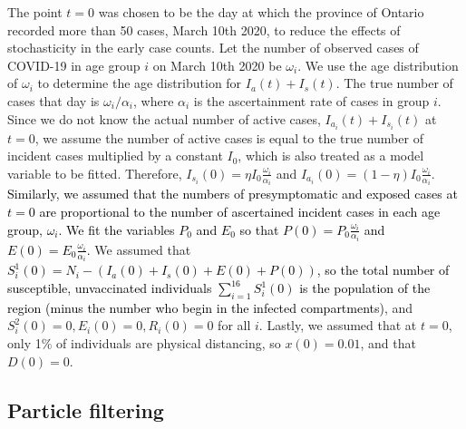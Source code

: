 The point $t = 0$ was chosen to be the day at which the province of Ontario recorded more than 50 cases, March 10th 2020, to reduce the effects of stochasticity in the early case counts. Let the number of observed cases of COVID-19 in age group $i$ on March 10th 2020 be $\omega_i$. We use the age distribution of $\omega_i$ to determine the age distribution for $I_a(t) + I_s(t)$. The true number of cases that day is $\omega_i / \alpha_i$, where $\alpha_i$ is the ascertainment rate of cases in group $i$. Since we do not know the actual number of active cases, $I_{a_i}(t) + I_{s_i}(t)$ at $t = 0$, we assume the number of active cases is equal to the true number of incident cases multiplied by a constant $I_0$, which is also treated as a model variable to be fitted. Therefore, $I_{s_i}(0) = \eta I_0 \frac{\omega_i}{\alpha_i}$ and $I_{a_i}(0) = (1 - \eta) I_0 \frac{\omega_i}{\alpha_i}$.
\textcolor{black}{Similarly, we assumed that the numbers of presymptomatic and exposed cases at $t = 0$ are proportional to the number of ascertained incident cases in each age group, $\omega_i$. We fit the variables $P_0$ and $E_0$ so that $P(0) = P_0 \frac{\omega_i}{\alpha_i}$ and  $E(0) = E_0 \frac{\omega_i}{\alpha_i}$.} We assumed that\textcolor{black}{$S^1_i(0) = N_i  - (I_a(0) + I_s(0) + E(0) + P(0))$, so the total number of susceptible, unvaccinated individuals $\sum_{i = 1}^{16} S^1_i(0)$ is the population of the region (minus the number who begin in the infected compartments)}, and $S^2_i(0) = 0, E_i(0) = 0, R_i(0) = 0$ for all $i$. Lastly, we assumed that at $t = 0$, only 1\% of individuals are physical distancing, so $x(0) = 0.01$, and that $D(0) = 0$.

\subsection{Particle filtering}

